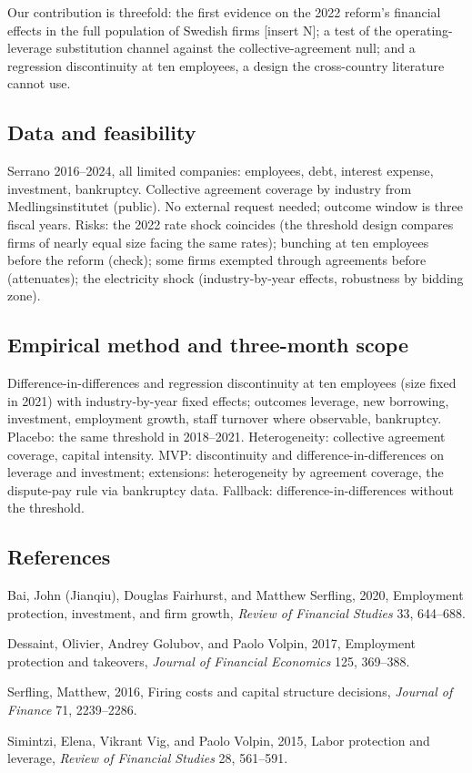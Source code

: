 \documentclass[12pt,a4paper]{article}
\newenvironment{refs}{\begin{list}{}{\setlength{\leftmargin}{1.5em}\setlength{\itemindent}{-1.5em}\setlength{\itemsep}{1pt}}}{\end{list}}
\begin{document}
Our contribution is threefold: the first evidence on the 2022 reform's financial effects in the full population of Swedish firms [insert N]; a test of the operating-leverage substitution channel against the collective-agreement null; and a regression discontinuity at ten employees, a design the cross-country literature cannot use.

\subsection{Data and feasibility}

Serrano 2016--2024, all limited companies: employees, debt, interest expense, investment, bankruptcy. Collective agreement coverage by industry from Medlingsinstitutet (public). No external request needed; outcome window is three fiscal years. Risks: the 2022 rate shock coincides (the threshold design compares firms of nearly equal size facing the same rates); bunching at ten employees before the reform (check); some firms exempted through agreements before (attenuates); the electricity shock (industry-by-year effects, robustness by bidding zone).

\subsection{Empirical method and three-month scope}

Difference-in-differences and regression discontinuity at ten employees (size fixed in 2021) with industry-by-year fixed effects; outcomes leverage, new borrowing, investment, employment growth, staff turnover where observable, bankruptcy. Placebo: the same threshold in 2018--2021. Heterogeneity: collective agreement coverage, capital intensity. MVP: discontinuity and difference-in-differences on leverage and investment; extensions: heterogeneity by agreement coverage, the dispute-pay rule via bankruptcy data. Fallback: difference-in-differences without the threshold.

\subsection*{References}
\begin{refs}
\item Bai, John (Jianqiu), Douglas Fairhurst, and Matthew Serfling, 2020, Employment protection, investment, and firm growth, \emph{Review of Financial Studies} 33, 644--688.
\item Dessaint, Olivier, Andrey Golubov, and Paolo Volpin, 2017, Employment protection and takeovers, \emph{Journal of Financial Economics} 125, 369--388.
\item Serfling, Matthew, 2016, Firing costs and capital structure decisions, \emph{Journal of Finance} 71, 2239--2286.
\item Simintzi, Elena, Vikrant Vig, and Paolo Volpin, 2015, Labor protection and leverage, \emph{Review of Financial Studies} 28, 561--591.
\end{refs}
\end{document}
